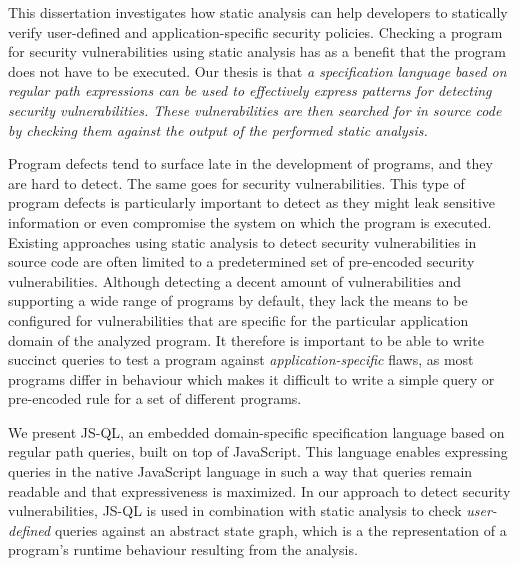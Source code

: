 \setcounter{page}{1}


This dissertation investigates how static analysis can help developers to statically verify user-defined and application-specific security policies. Checking a program for security vulnerabilities using static analysis has as a benefit that the program does not have to be executed.
Our thesis is that \textit{a specification language based on regular path expressions can be used to effectively express patterns for detecting security vulnerabilities. These vulnerabilities are then searched for in source code by checking them against the output of the performed static analysis.}

Program defects tend to surface late in the development of programs, and they are hard to detect. The same goes for security vulnerabilities. This type of program defects is particularly important to detect as they might leak sensitive information or even compromise the system on which the program is executed. Existing approaches using static analysis to detect security vulnerabilities in source code are often limited to a predetermined set of pre-encoded security vulnerabilities. Although detecting a decent amount of vulnerabilities and supporting a wide range of programs by default, they lack the means to be configured for vulnerabilities that are specific for the particular application domain of the analyzed program. It therefore is important to be able to write succinct queries to test a program against \textit{application-specific} flaws, as most programs differ in behaviour which makes it difficult to write a simple query or pre-encoded rule for a set of different programs. 

We present JS-QL, an embedded domain-specific specification language based on regular path queries, built on top of JavaScript. This language enables expressing queries in the native JavaScript language in such a way that queries remain readable and that expressiveness is maximized. In our approach to detect security vulnerabilities, JS-QL is used in combination with static analysis to check \textit{user-defined} queries against an abstract state graph, which is a the representation of a program's runtime behaviour resulting from the analysis.


